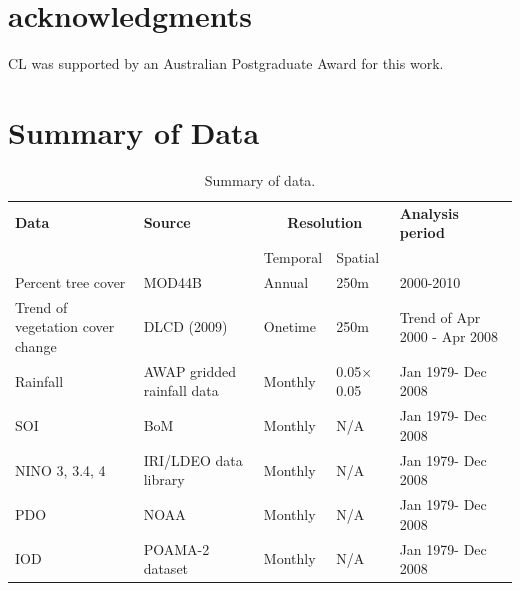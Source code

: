 \documentclass[onecolumn,referee]{svjour3}
\begin{document}
\section{acknowledgments}
CL was supported by an Australian Postgraduate Award for this work.


\appendix

\section{Summary of Data}

 \begin{table}
 \caption{Summary of data.}
  \label{tab:ch3Data}
 \begin{tabular}{lllll}
  \hline
  \textbf{Data} & \textbf{Source} & \multicolumn{2}{c}{\textbf{Resolution}} & \textbf{Analysis period} \\\cline{3-4}
  & & Temporal & Spatial & \\\hline
  Percent tree cover & MOD44B & Annual &	250m & 2000-2010\\
  Trend of vegetation cover change  &	DLCD (2009)	& Onetime & 250m	& Trend of Apr 2000 - Apr 2008\\
  Rainfall &	AWAP gridded rainfall data &	Monthly &	0.05\textdegree$\times$0.05\textdegree & Jan 1979- Dec 2008\\
  SOI	& BoM	& Monthly &	N/A &	Jan 1979- Dec 2008\\
  NINO 3, 3.4, 4 &	IRI/LDEO data library	& Monthly	& N/A	& Jan 1979- Dec 2008\\
  PDO	& NOAA & Monthly	& N/A	& Jan 1979- Dec 2008\\
  IOD	& POAMA-2 dataset	& Monthly	& N/A	& Jan 1979- Dec 2008\\
  \hline
  \end{tabular}
\end{table}

\newpage
%

\end{document}
